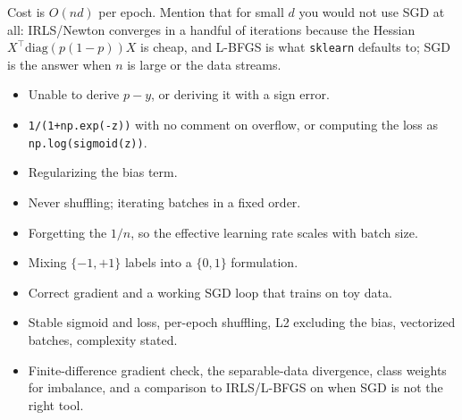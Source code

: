 \begin{interviewq}
Cost is $O(nd)$ per epoch. Mention that for small $d$ you would not use SGD at all: IRLS/Newton converges in a handful of iterations because the Hessian $X^\top \mathrm{diag}(p(1-p)) X$ is cheap, and L-BFGS is what \texttt{sklearn} defaults to; SGD is the answer when $n$ is large or the data streams.

\redflags
\begin{itemize}
    \item Unable to derive $p - y$, or deriving it with a sign error.
    \item \texttt{1/(1+np.exp(-z))} with no comment on overflow, or computing the loss as \texttt{np.log(sigmoid(z))}.
    \item Regularizing the bias term.
    \item Never shuffling; iterating batches in a fixed order.
    \item Forgetting the $1/n$, so the effective learning rate scales with batch size.
    \item Mixing $\{-1, +1\}$ labels into a $\{0, 1\}$ formulation.
\end{itemize}


\goodgreat
\begin{itemize}
    \item {} Correct gradient and a working SGD loop that trains on toy data.
    \item {} Stable sigmoid and loss, per-epoch shuffling, L2 excluding the bias, vectorized batches, complexity stated.
    \item {} Finite-difference gradient check, the separable-data divergence, class weights for imbalance, and a comparison to IRLS/L-BFGS on when SGD is not the right tool.
\end{itemize}

\end{interviewq}

